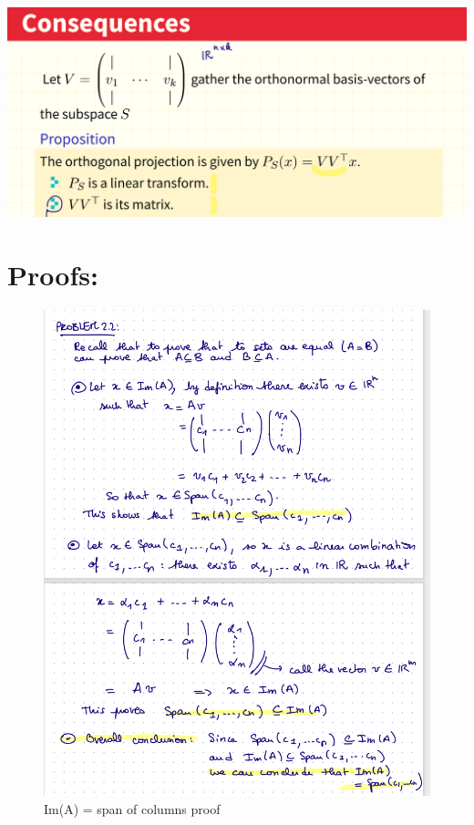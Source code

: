 \documentclass[12pt,twoside]{article}
\begin{document}
\includegraphics[scale=.45]{screenshots/consequences of orthogonal projection.png}

\section{Proofs:}

\begin{figure}[h]
    \centering
    \includegraphics[scale=.7]{screenshots/Im(A) = span of columns proof.png}
    \caption{Im(A) = span of columns proof}
    \label{fig:my_label}
\end{figure}
\end{document}
